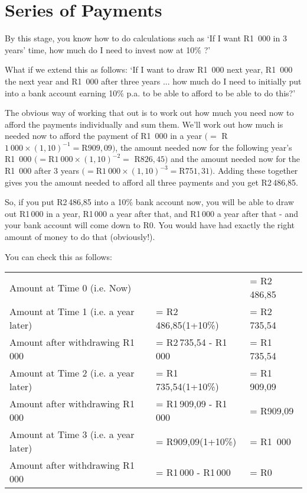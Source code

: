 \section{Series of Payments}

By this stage, you know how to do calculations such as `If I want R1~000 in 3 years' time, how much do I need to invest now at 10\% ?'

What if we extend this as follows: `If I want to draw R1~000 next year, R1~000 the next year and R1~000 after three years ... how much do I need to initially put into a bank account earning 10\% p.a. to be able to afford to be able to do this?'

The obvious way of working that out is to work out how much you need now to afford the payments individually and sum them. We'll work out how much is needed now to afford the payment of R1~000 in a year $(= $ {R}$1~000\times (1,10)^{-1} = ${R}$909,09)$, the amount needed now for the following year's R1~000 $(= ${R}$1~000\times (1,10)^{-2} = $ {R}$826,45)$ and the amount needed now for the R1~000 after 3 years $(= ${R}$1~000\times (1,10)^{-3} =${R}$751,31)$. Adding these together gives you the amount needed to afford all three payments and you get R2\,486,85.

So, if you put R2\,486,85 into a 10\% bank account now, you will be able to draw out R1\,000 in a year, R1\,000 a year after that, and R1\,000 a year after that - and your bank account will come down to R0. You would have had exactly the right amount of money to do that (obviously!).

You can check this as follows:

\begin{tabular}{lll}
Amount at Time 0 (i.e. Now) &&= R2\,486,85\\
Amount at Time 1 (i.e. a year later) &= R2\,486,85(1+10\%) &= R2\,735,54\\
Amount after withdrawing R1\,000 &= R2\,735,54 - R1\,000 &= R1\,735,54\\
Amount at Time 2 (i.e. a year later) &= R1\,735,54(1+10\%) &= R1\,909,09\\
Amount after withdrawing R1\,000 &= R1\,909,09 - R1\,000 &= R909,09\\
Amount at Time 3 (i.e. a year later) &= R909,09(1+10\%) &= R1~000\\
Amount after withdrawing R1\,000 &= R1\,000 - R1\,000 &= R0\\
\end{tabular}

